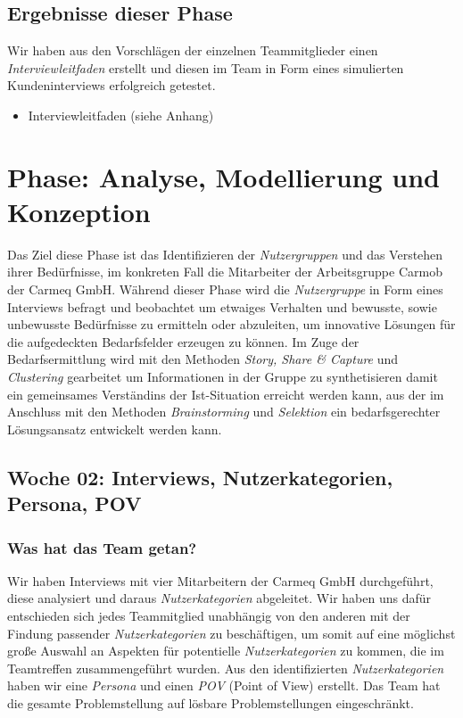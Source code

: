 \documentclass[12pt,a4paper]{article}
\begin{document}
\subsection{Ergebnisse dieser Phase}

Wir haben aus den Vorschl\"agen der einzelnen Teammitglieder einen \textit{Interviewleitfaden} erstellt und diesen im Team in Form eines simulierten Kundeninterviews erfolgreich getestet.

\begin{itemize}
\item Interviewleitfaden (siehe Anhang)
\end{itemize}



\section{Phase: Analyse, Modellierung und Konzeption}

Das Ziel diese Phase ist das Identifizieren der \textit{Nutzergruppen} und das Verstehen ihrer Bed\"urfnisse, im konkreten Fall die Mitarbeiter der Arbeitsgruppe Carmob der Carmeq GmbH. W\"ahrend dieser Phase wird die \textit{Nutzergruppe} in Form eines Interviews befragt und beobachtet um etwaiges Verhalten und bewusste, sowie unbewusste Bed\"urfnisse zu ermitteln oder abzuleiten, um innovative L\"osungen f\"ur die aufgedeckten Bedarfsfelder erzeugen zu k\"onnen. Im Zuge der Bedarfsermittlung wird mit den Methoden \textit{Story, Share \& Capture} und \textit{Clustering} gearbeitet um Informationen in der Gruppe zu synthetisieren damit ein gemeinsames Verst\"andins der Ist-Situation erreicht werden kann, aus der im Anschluss mit den Methoden \textit{Brainstorming} und \textit{Selektion} ein bedarfsgerechter L\"osungsansatz entwickelt werden kann. 

\subsection{Woche 02: Interviews, Nutzerkategorien, Persona, POV}

\subsubsection{Was hat das Team getan?}

Wir haben Interviews mit vier Mitarbeitern der Carmeq GmbH durchgef\"uhrt, diese analysiert und daraus \textit{Nutzerkategorien} abgeleitet. Wir haben uns daf\"ur entschieden sich jedes Teammitglied unabh\"angig von den anderen mit der Findung passender \textit{Nutzerkategorien} zu besch\"aftigen, um somit auf eine m\"oglichst gro\ss e Auswahl an Aspekten f\"ur potentielle \textit{Nutzerkategorien} zu kommen, die im Teamtreffen zusammengef\"uhrt wurden. Aus den identifizierten \textit{Nutzerkategorien} haben wir eine \textit{Persona} und einen \textit{POV} (Point of View) erstellt. Das Team hat die gesamte Problemstellung auf l\"osbare Problemstellungen eingeschr\"ankt.
\end{document}

